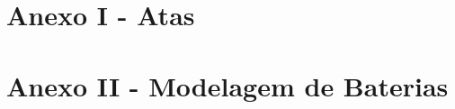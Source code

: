 \appendix
\section{Anexo I - Atas} 
\label{Atas} 




\appendix
\section{Anexo II - Modelagem de Baterias} 
\label{App:AppendixModelagemBateria} 








